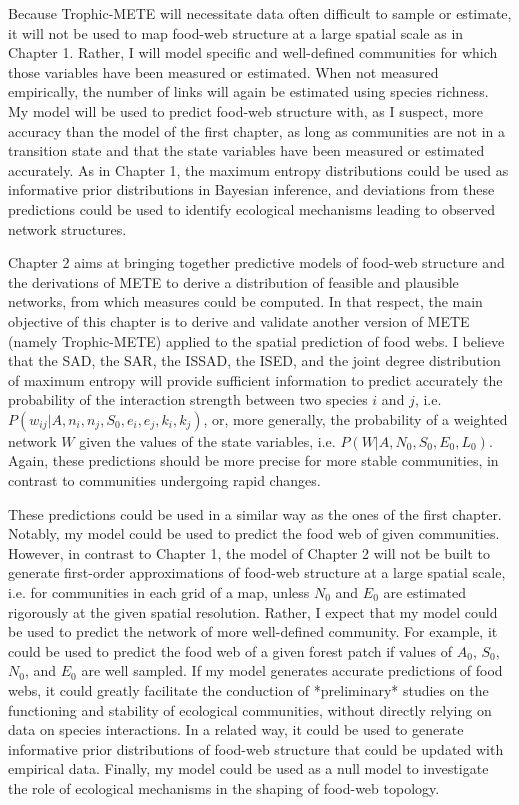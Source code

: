 Because Trophic-METE will necessitate data often difficult to sample or
estimate, it will not be used to map food-web structure at a large spatial scale
as in Chapter 1. Rather, I will model specific and well-defined communities for
which those variables have been measured or estimated. When not measured
empirically, the number of links will again be estimated using species richness.
My model will be used to predict food-web structure with, as I suspect, more
accuracy than the model of the first chapter, as long as communities are not in
a transition state and that the state variables have been measured or estimated
accurately. As in Chapter 1, the maximum entropy distributions could be used as
informative prior distributions in Bayesian inference, and deviations from these
predictions could be used to identify ecological mechanisms leading to observed
network structures.

Chapter 2 aims at bringing together predictive models of food-web structure and
the derivations of METE to derive a distribution of feasible and plausible
networks, from which measures could be computed. In that respect, the main
objective of this chapter is to derive and validate another version of METE
(namely Trophic-METE) applied to the spatial prediction of food webs. I believe
that the SAD, the SAR, the ISSAD, the ISED, and the joint degree distribution of
maximum entropy will provide sufficient information to predict accurately the
probability of the interaction strength between two species $i$ and $j$, i.e.
$P(w_{ij}|A, n_i, n_j, S_0, e_i, e_j, k_i, k_j)$, or, more generally, the
probability of a weighted network $W$ given the values of the state variables,
i.e. $P(W|A, N_0, S_0, E_0, L_0)$. Again, these predictions should be more
precise for more stable communities, in contrast to communities undergoing rapid
changes.  

These predictions could be used in a similar way as the ones of the first
chapter. Notably, my model could be used to predict the food web of given
communities. However, in contrast to Chapter 1, the model of Chapter 2 will not
be built to generate first-order approximations of food-web structure at a large
spatial scale, i.e. for communities in each grid of a map, unless $N_0$ and
$E_0$ are estimated rigorously at the given spatial resolution. Rather, I expect
that my model could be used to predict the network of more well-defined
community. For example, it could be used to predict the food web of a given
forest patch if values of $A_0$, $S_0$, $N_0$, and $E_0$ are well sampled. If my
model generates accurate predictions of food webs, it could greatly facilitate
the conduction of *preliminary* studies on the functioning and stability of
ecological communities, without directly relying on data on species
interactions. In a related way, it could be used to generate informative prior
distributions of food-web structure that could be updated with empirical data.
Finally, my model could be used as a null model to investigate the role of
ecological mechanisms in the shaping of food-web topology.

